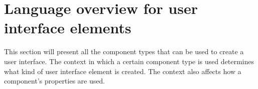 
\section{Language overview for user interface elements
\label{sect:language:uiref}}
This section will present all the component types that can be used to create a
user interface. The context in which a certain component type is used
determines what kind of user interface element is created. The context also
affects how a component's properties are used.

